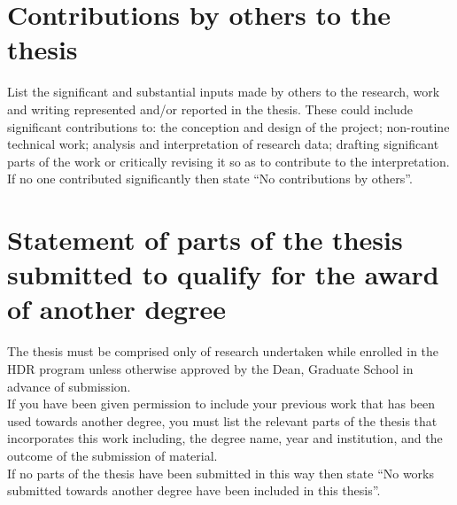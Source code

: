 



\section*{Contributions by others to the thesis}

\begin{instructional}
	List the significant and substantial inputs made by others to the research, work and writing represented and/or reported in the thesis. These could include significant contributions to: the conception and design of the project; non-routine technical work; analysis and interpretation of research data; drafting significant parts of the work or critically revising it so as to contribute to the interpretation. \\
    
    \noindent
	If no one contributed significantly then state ``No contributions by others''.
\end{instructional}





\section*{Statement of parts of the thesis submitted to qualify for the award of another degree}

\begin{instructional}
    The thesis must be comprised only of research undertaken while enrolled in the HDR program unless otherwise approved by the Dean, Graduate School in advance of submission.\\
    
    \noindent
    If you have been given permission to include your previous work that has been used towards another degree, you must list the relevant parts of the thesis that incorporates this work including, the degree name, year and institution, and the outcome of the submission of material. \\
    
    \noindent
    If no parts of the thesis have been submitted in this way then state ``No works submitted towards another degree have been included in this thesis''.
\end{instructional}

